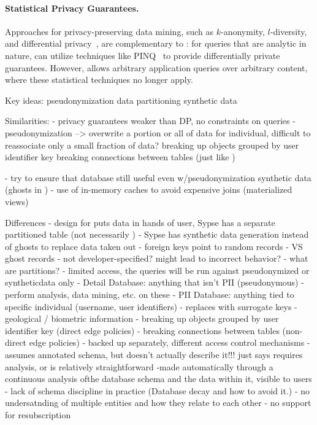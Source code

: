 \paragraph{Statistical Privacy Guarantees.}
Approaches for privacy-preserving data mining, such as $k$-anonymity, $l$-diversity, and
differential privacy~\cite{dataminingmodels}, are complementary to \sys: for queries that are
analytic in nature, \name can utilize techniques like PINQ~\cite{pinq} to provide differentially
private guarantees. However, \sys allows arbitrary application queries over arbitrary content, where
these statistical techniques no longer apply. 

\iffalse
Key ideas:
    pseudonymization 
    data partitioning
    synthetic data

Similarities:
- privacy guarantees weaker than DP, no constraints on queries
- pseudonymization --> overwrite a portion or all of data for individual, difficult to reassociate
    only a small fraction of data?
    breaking up objects grouped by user identifier key
    breaking connections between tables (just like )

- try to ensure that database still useful even w/pseudonymization
    synthetic data (ghosts in \name) 
- use of in-memory caches to avoid expensive joins (materialized views)

Differences
- design for \name puts data in hands of user, Sypse has a separate partitioned table (not
necessarily )
- Sypse has synthetic data generation instead of ghosts to replace data taken out
    - foreign keys point to random records
    - VS ghost records
    - not developer-specified? might lead to incorrect behavior?
- what are partitions?
    - limited access, the queries will be run against pseudonymized or syntheticdata only 
    - Detail Database: anything that isn't PII (pseudonymous)
        - perform analysis, data mining, etc. on these
    - PII Database: anything tied to specific individual (username, user identifiers)
        - replaces with surrogate keys
        - geological / biometric information
        - breaking up objects grouped by user identifier key (direct edge policies)
        - breaking connections between tables (non-direct edge policies)
    - backed up separately, different access control mechanisms
- assumes annotated schema, but doesn't actually describe it!!! just says requires analysis, or is
relatively straightforward
    -made automatically through a continuous analysis ofthe database schema and the data within it,
    visible to users
    - lack of schema discipline in practice (Database decay and how to avoid it.)
    - no undersatnding of multiple entities and how they relate to each other
- no support for resubscription

